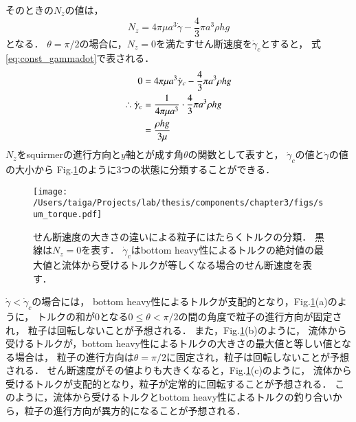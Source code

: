 そのときの$N_z$の値は，
    \begin{equation}
        N_z = 4 \pi \mu a^3 \dot{\gamma} - \frac{4}{3} \pi a^3 \rho h g
        \label{eq:sum_of_torque_z_halfpi}
    \end{equation}
となる．
$\theta = \pi / 2$の場合に，$N_z = 0$を満たすせん断速度を$\dot{\gamma}_c$とすると，
式\eqref{eq:const_gammadot}で表される．
    \begin{align}
        0 &= 4 \pi \mu a^3 \dot{\gamma}_c - \frac{4}{3} \pi a^3 \rho h g \\
        \therefore
        \dot{\gamma}_c 
        &= \frac{1}{4 \pi \mu a^3} \cdot \frac{4}{3} \pi a^3 \rho h g \notag \\
        &= \frac{\rho h g}{3 \mu}
        \label{eq:const_gammadot}
    \end{align}
$N_z$をsquirmerの進行方向と$y$軸とが成す角$\theta$の関数として表すと，
$\dot{\gamma}_c$の値と$\dot{\gamma}$の値の大小から
Fig.\ref{fig:sum_torque}のように3つの状態に分類することができる．
    \begin{figure}[H]
        \centering
        \texttt{[image: /Users/taiga/Projects/lab/thesis/components/chapter3/figs/sum\_torque.pdf]}
        \caption{せん断速度の大きさの違いによる粒子にはたらくトルクの分類．
        黒線は$N_z = 0$を表す．
        $\dot{\gamma}_c$はbottom heavy性によるトルクの絶対値の最大値と流体から受けるトルクが等しくなる場合のせん断速度を表す．}
        \label{fig:sum_torque}
    \end{figure}
\noindent
$\dot{\gamma} < \dot{\gamma}_c$の場合には，
bottom heavy性によるトルクが支配的となり，Fig.\ref{fig:sum_torque}(a)のように，
トルクの和が0となる$0 \leq \theta < \pi / 2$の間の角度で粒子の進行方向が固定され，
粒子は回転しないことが予想される．
また，Fig.\ref{fig:sum_torque}(b)のように，
流体から受けるトルクが，bottom heavy性によるトルクの大きさの最大値と等しい値となる場合は，
粒子の進行方向は$\theta = \pi / 2$に固定され，粒子は回転しないことが予想される．
せん断速度がその値よりも大きくなると，Fig.\ref{fig:sum_torque}(c)のように，
流体から受けるトルクが支配的となり，粒子が定常的に回転することが予想される．
このように，流体から受けるトルクとbottom heavy性によるトルクの釣り合いから，粒子の進行方向が異方的になることが予想される．

